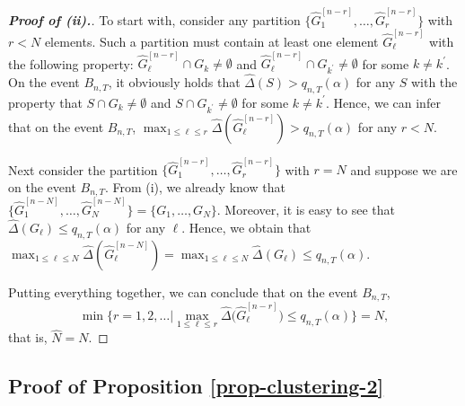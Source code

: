 \documentclass[a4paper,12pt]{article}
\begin{document}
\begin{proof}[\textnormal{\textbf{Proof of (ii).}}]
To start with, consider any partition $\{ \widehat{G}_1^{[n-r]},\ldots,\widehat{G}_r^{[n-r]} \}$ with $r < N$ elements. Such a partition must contain at least one element $\widehat{G}_\ell^{[n-r]}$ with the following property: $\widehat{G}_\ell^{[n-r]} \cap G_k \ne \emptyset$ and $\widehat{G}_\ell^{[n-r]} \cap G_{k^\prime} \ne \emptyset$ for some $k \ne k^\prime$. On the event $B_{n,T}$, it obviously holds that $\widehat{\Delta}(S) > q_{n,T}(\alpha)$ for any $S$ with the property that $S \cap G_k \ne \emptyset$ and $S \cap G_{k^\prime} \ne \emptyset$ for some $k \ne k^\prime$. Hence, we can infer that on the event $B_{n,T}$, $\max_{1 \le \ell \le r} \widehat{\Delta} ( \widehat{G}_\ell^{[n-r]} ) > q_{n,T}(\alpha)$ for any $r < N$. 

Next consider the partition $\{ \widehat{G}_1^{[n-r]},\ldots,\widehat{G}_r^{[n-r]} \}$ with $r = N$ and suppose we are on the event $B_{n,T}$. From (i), we already know that $\{ \widehat{G}_1^{[n-N]},\ldots,\widehat{G}_N^{[n-N]} \} =\{ G_1,\ldots,G_N \}$. Moreover, it is easy to see that $\widehat{\Delta}(G_\ell) \le q_{n,T}(\alpha)$ for any $\ell$. Hence, we obtain that $\max_{1 \le \ell \le N} \widehat{\Delta} ( \widehat{G}_\ell^{[n-N]} ) = \max_{1 \le \ell \le N} \widehat{\Delta} (G_\ell) \le q_{n,T}(\alpha)$.

Putting everything together, we can conclude that on the event $B_{n,T}$, 
\[ \min \Big\{ r = 1,2,\ldots \Big| \max_{1 \le \ell \le r} \widehat{\Delta} \big( \widehat{G}_\ell^{[n-r]} \big) \le q_{n,T}(\alpha) \Big\} = N, \]
that is, $\widehat{N} = N$. 
\end{proof}



\subsection*{Proof of Proposition \ref{prop-clustering-2}}
\end{document}
